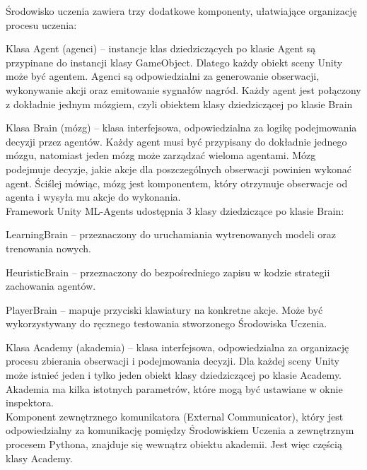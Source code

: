 Środowisko uczenia zawiera trzy dodatkowe komponenty, ułatwiające organizację procesu uczenia:
\begin{enumerate*}
\item Klasa Agent (agenci) -- instancje klas dziedziczących po klasie Agent są przypinane do instancji klasy GameObject. Dlatego każdy obiekt sceny Unity może być agentem. Agenci są odpowiedzialni za generowanie obserwacji, wykonywanie akcji oraz emitowanie sygnałów nagród. Każdy agent jest połączony z dokładnie jednym mózgiem, czyli obiektem klasy dziedziczącej po klasie Brain
\item Klasa Brain (mózg) -- klasa interfejsowa, odpowiedzialna za logikę podejmowania decyzji przez agentów. Każdy agent musi być przypisany do dokładnie jednego mózgu, natomiast jeden mózg może zarządzać wieloma agentami. 
Mózg podejmuje decyzje, jakie akcje dla poszczególnych obserwacji powinien wykonać agent. Ściślej mówiąc, mózg jest komponentem, który otrzymuje obserwacje od agenta i wysyła mu akcje do wykonania. \\
Framework Unity ML-Agents udostępnia 3 klasy dziedziczące po klasie Brain:
\begin{itemize*}
\item LearningBrain -- przeznaczony do uruchamiania wytrenowanych modeli oraz trenowania nowych.
\item HeuristicBrain -- przeznaczony do bezpośredniego zapisu w kodzie strategii zachowania agentów.
\item PlayerBrain -- mapuje przyciski klawiatury na konkretne akcje. Może być wykorzystywany do ręcznego testowania stworzonego Środowiska Uczenia.
\end{itemize*}
\item Klasa Academy (akademia) -- klasa interfejsowa, odpowiedzialna za organizację procesu zbierania obserwacji i podejmowania decyzji. Dla każdej sceny Unity może istnieć jeden i tylko jeden obiekt klasy dziedziczącej po klasie Academy. Akademia ma kilka istotnych parametrów, które mogą być ustawiane w oknie inspektora. \\
Komponent zewnętrznego komunikatora (External Communicator), który jest odpowiedzialny za komunikację pomiędzy Środowiskiem Uczenia a zewnętrznym procesem Pythona, znajduje się wewnątrz obiektu akademii.
Jest więc częścią klasy Academy.
\end{enumerate*}

